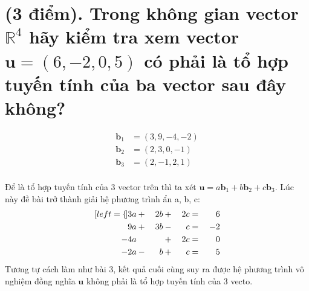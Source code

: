 \documentclass{article}
\begin{document}
\section[Câu 3]{\large\normalfont (3 điểm). Trong không gian vector $\mathbb{R}^4$ hãy kiểm tra xem vector $\mathbf{u} = (6, -2, 0, 5)$ có phải là tổ hợp tuyến tính của ba vector sau đây không?}
\begin{align*}
	\mathbf{b}_1 & = (3, 9, -4, -2) \\
	\mathbf{b}_2 & = (2, 3, 0, -1)  \\
	\mathbf{b}_3 & = (2, -1, 2, 1)  \\
\end{align*}
\begin{flushleft}
	Để  là tổ hợp tuyến tính của 3 vector trên thì ta xét \colorbox{gray!20}{$\mathbf{u} = a\mathbf{b}_1 + b\mathbf{b}_2 + c\mathbf{b}_3$}. Lúc này đề bài trở thành giải hệ phương trình ẩn a, b, c: 
	\begin{alignat*}{3}[left = \empheqlbrace]
		3a  & {}+{} & 2b & {}+{}  & 2c & {}={} & 6  \\
		9a  & {}+{} & 3b & {} -{} & c  & {}={} & -2 \\
		-4a & {}{}  &    & {}+{}  & 2c & {}={} & 0  \\
		-2a & {}-{} & b  & {}+{}  & c  & {}={} & 5  
	\end{alignat*}
	Tương tự cách làm như bài 3, kết quả cuối cùng suy ra được hệ phương trình vô nghiệm đồng nghĩa $\mathbf{u}$ không phải là tổ hợp tuyến tính của 3 vecto.
\end{flushleft}
\end{document}
